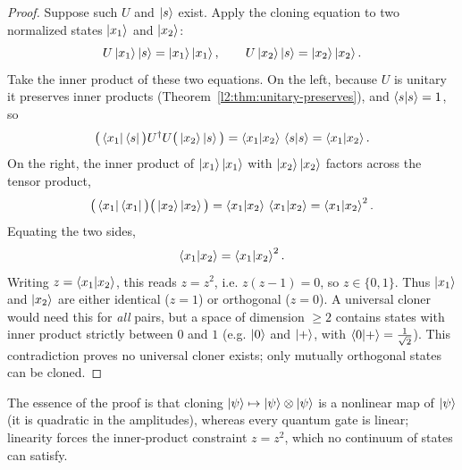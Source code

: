 \begin{proof}
Suppose such $U$ and $\ket{s}$ exist. Apply the cloning equation to two
normalized states $\ket{x_{1}}$ and $\ket{x_{2}}$:
\[
  U\ket{x_{1}}\ket{s}=\ket{x_{1}}\ket{x_{1}},\qquad
  U\ket{x_{2}}\ket{s}=\ket{x_{2}}\ket{x_{2}}.
\]
Take the inner product of these two equations. On the left, because $U$ is
unitary it preserves inner products (Theorem~\ref{l2:thm:unitary-preserves}), and
$\braket{s|s}=1$, so
\[
  \big(\bra{x_{1}}\bra{s}\big)U^{\dagger}U\big(\ket{x_{2}}\ket{s}\big)
   = \braket{x_{1}|x_{2}}\,\braket{s|s}
   = \braket{x_{1}|x_{2}}.
\]
On the right, the inner product of $\ket{x_{1}}\ket{x_{1}}$ with
$\ket{x_{2}}\ket{x_{2}}$ factors across the tensor product,
\[
  \big(\bra{x_{1}}\bra{x_{1}}\big)\big(\ket{x_{2}}\ket{x_{2}}\big)
   = \braket{x_{1}|x_{2}}\,\braket{x_{1}|x_{2}}
   = \braket{x_{1}|x_{2}}^{2}.
\]
Equating the two sides,
\[
  \braket{x_{1}|x_{2}} = \braket{x_{1}|x_{2}}^{2}.
\]
Writing $z=\braket{x_{1}|x_{2}}$, this reads $z=z^{2}$, i.e. $z(z-1)=0$, so
$z\in\{0,1\}$. Thus $\ket{x_{1}}$ and $\ket{x_{2}}$ are either identical
($z=1$) or orthogonal ($z=0$). A universal cloner would need this for
\emph{all} pairs, but a space of dimension $\geq 2$ contains states with inner
product strictly between $0$ and $1$ (e.g. $\ket{0}$ and $\ket{+}$, with
$\braket{0|+}=\tfrac{1}{\sqrt2}$). This contradiction proves no universal cloner
exists; only mutually orthogonal states can be cloned.
\end{proof}

The essence of the proof is that cloning
$\ket{\psi}\mapsto\ket{\psi}\otimes\ket{\psi}$ is a nonlinear map of $\ket{\psi}$
(it is quadratic in the amplitudes), whereas every quantum gate is linear;
linearity forces the inner-product constraint $z=z^{2}$, which no continuum of
states can satisfy.

